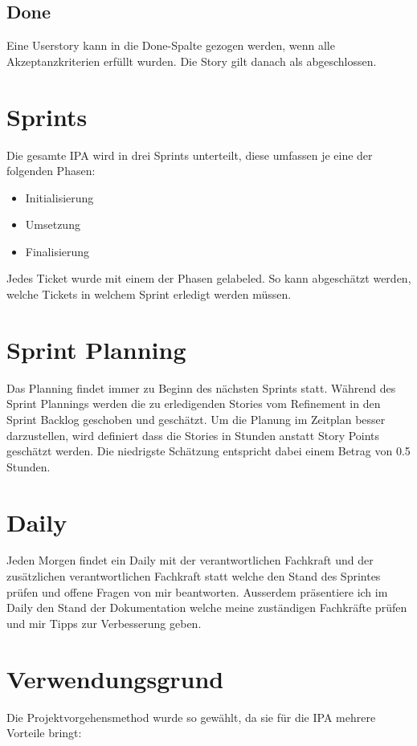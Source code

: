 \subsection{Done}
Eine Userstory kann in die Done-Spalte gezogen werden, wenn alle Akzeptanzkriterien erfüllt wurden.
Die Story gilt danach als abgeschlossen.

\section{Sprints}
Die gesamte IPA wird in drei Sprints unterteilt, diese umfassen je eine der folgenden
Phasen:

\begin{itemize}
\item Initialisierung
\item Umsetzung
\item Finalisierung    
\end{itemize}

Jedes Ticket wurde mit einem der Phasen gelabeled. So kann abgeschätzt werden, welche Tickets in welchem
Sprint erledigt werden müssen.

\section{Sprint Planning}
Das Planning findet immer zu Beginn des nächsten Sprints statt. Während des Sprint Plannings werden die zu erledigenden
Stories vom Refinement in den Sprint Backlog geschoben und geschätzt. Um die Planung im Zeitplan
besser darzustellen, wird definiert dass die Stories in Stunden anstatt Story Points geschätzt werden. Die niedrigste Schätzung
entspricht dabei einem Betrag von 0.5 Stunden.

\section{Daily}
Jeden Morgen findet ein Daily mit der verantwortlichen Fachkraft und der zusätzlichen verantwortlichen Fachkraft statt
welche den Stand des Sprintes prüfen und offene Fragen von mir beantworten. Ausserdem präsentiere ich im Daily den Stand der 
Dokumentation welche meine zuständigen Fachkräfte prüfen und mir Tipps zur Verbesserung geben. 

\section{Verwendungsgrund}
Die Projektvorgehensmethod wurde so gewählt, da sie für die IPA mehrere Vorteile bringt:

